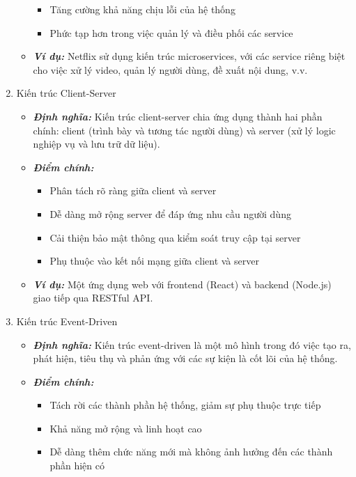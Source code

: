 \begin{enumerate}
\begin{itemize}
\begin{itemize}
            \item Tăng cường khả năng chịu lỗi của hệ thống
            \item Phức tạp hơn trong việc quản lý và điều phối các service
        \end{itemize}
        \item \textbf{\textit{Ví dụ:}} Netflix sử dụng kiến trúc microservices, với các service riêng biệt cho việc xử lý video, quản lý người dùng, đề xuất nội dung, v.v.
    \end{itemize}
    \item Kiến trúc Client-Server
    \begin{itemize}
        \item \textbf{\textit{Định nghĩa:}} Kiến trúc client-server chia ứng dụng thành hai phần chính: client (trình bày và tương tác người dùng) và server (xử lý logic nghiệp vụ và lưu trữ dữ liệu).
        \item \textbf{\textit{Điểm chính:}} 
        \begin{itemize}
            \item Phân tách rõ ràng giữa client và server
            \item Dễ dàng mở rộng server để đáp ứng nhu cầu người dùng
            \item Cải thiện bảo mật thông qua kiểm soát truy cập tại server
            \item Phụ thuộc vào kết nối mạng giữa client và server
        \end{itemize}
        \item \textbf{\textit{Ví dụ:}} Một ứng dụng web với frontend (React) và backend (Node.js) giao tiếp qua RESTful API.
    \end{itemize}
    \item Kiến trúc Event-Driven
    \begin{itemize}
        \item \textbf{\textit{Định nghĩa:}} Kiến trúc event-driven là một mô hình trong đó việc tạo ra, phát hiện, tiêu thụ và phản ứng với các sự kiện là cốt lõi của hệ thống.
        \item \textbf{\textit{Điểm chính:}} 
        \begin{itemize}
            \item Tách rời các thành phần hệ thống, giảm sự phụ thuộc trực tiếp
            \item Khả năng mở rộng và linh hoạt cao
            \item Dễ dàng thêm chức năng mới mà không ảnh hưởng đến các thành phần hiện có

\end{itemize}
\end{itemize}
\end{enumerate}
